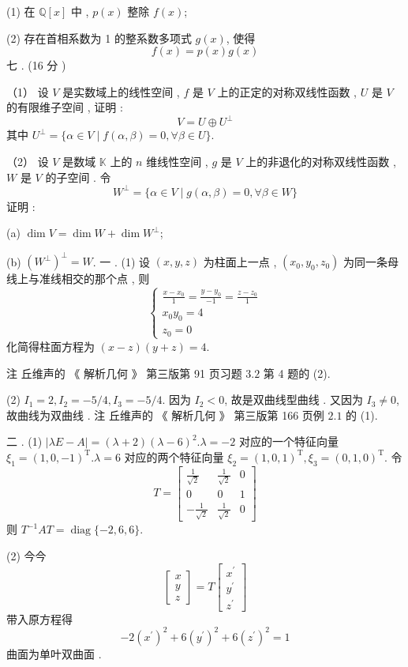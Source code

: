 \documentclass[10pt]{article}
\begin{document}
(1)  在  $\mathbb{Q}[x]$  中 , $p(x)$  整除  $f(x)$;

(2)  存在首相系数为  1  的整系数多项式  $g(x)$,  使得 
$$
f(x)=p(x) g(x)
$$
 七 . (16  分 )

（1） 设  $V$  是实数域上的线性空间 , $f$  是  $V$  上的正定的对称双线性函数 , $U$  是  $V$  的有限维子空间 ,  证明 :
$$
V=U \oplus U^{\perp}
$$
 其中  $U^{\perp}=\{\alpha \in V \mid f(\alpha, \beta)=0, \forall \beta \in U\}$.

（2） 设  $V$  是数域  $\mathbb{K}$  上的  $n$  维线性空间 , $g$  是  $V$  上的非退化的对称双线性函数 , $W$  是  $V$  的子空间 .  令 
$$
W^{\perp}=\{\alpha \in V \mid g(\alpha, \beta)=0, \forall \beta \in W\}
$$
 证明 :

(a) $\operatorname{dim} V=\operatorname{dim} W+\operatorname{dim} W^{\perp}$;

(b) $\left(W^{\perp}\right)^{\perp}=W$.  一 . (1)  设  $(x, y, z)$  为柱面上一点 , $\left(x_{0}, y_{0}, z_{0}\right)$  为同一条母线上与准线相交的那个点 ,  则 
$$
\left\{\begin{array}{r}
\frac{x-x_{0}}{1}=\frac{y-y_{0}}{-1}=\frac{z-z_{0}}{1} \\
x_{0} y_{0}=4 \\
z_{0}=0
\end{array}\right.
$$
 化简得柱面方程为  $(x-z)(y+z)=4$.

 注   丘维声的 《 解析几何 》 第三版第  91  页习题  $3.2$  第  4  题的  (2).

(2) $I_{1}=2, I_{2}=-5 / 4, I_{3}=-5 / 4$.  因为  $I_{2}<0$,  故是双曲线型曲线 .  又因为  $I_{3} \neq 0$,  故曲线为双曲线 .  注   丘维声的 《 解析几何 》 第三版第  166  页例  $2.1$  的  (1).

 二 . (1) $|\lambda E-A|=(\lambda+2)(\lambda-6)^{2} . \lambda=-2$  对应的一个特征向量  $\xi_{1}=(1,0,-1)^{\mathrm{T}} . \lambda=6$  对应的两个特征向量  $\xi_{2}=(1,0,1)^{\mathrm{T}}, \xi_{3}=(0,1,0)^{\mathrm{T}}$.  令 
$$
T=\left[\begin{array}{ccc}
\frac{1}{\sqrt{2}} & \frac{1}{\sqrt{2}} & 0 \\
0 & 0 & 1 \\
-\frac{1}{\sqrt{2}} & \frac{1}{\sqrt{2}} & 0
\end{array}\right]
$$
 则  $T^{-1} A T=\operatorname{diag}\{-2,6,6\}$.

(2)  今今 
$$
\left[\begin{array}{l}
x \\
y \\
z
\end{array}\right]=T\left[\begin{array}{l}
x^{\prime} \\
y^{\prime} \\
z^{\prime}
\end{array}\right]
$$
 带入原方程得 
$$
-2\left(x^{\prime}\right)^{2}+6\left(y^{\prime}\right)^{2}+6\left(z^{\prime}\right)^{2}=1
$$
 曲面为单叶双曲面 .
\end{document}
